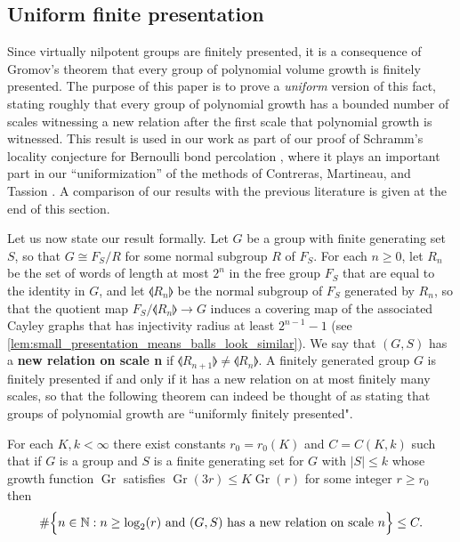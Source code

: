 \subsection{Uniform finite presentation}

Since virtually nilpotent groups are finitely presented, it is a consequence of Gromov's theorem that every group of polynomial volume growth is finitely presented. The purpose of this paper is to prove a \emph{uniform} version of this fact, stating roughly that every group of polynomial growth has a bounded number of scales witnessing a new relation after the first scale that polynomial growth is witnessed. This result is used in our work \cite{Locality} as part of our proof  of Schramm's locality conjecture for Bernoulli bond percolation \cite{MR2773031}, where it plays an important part in our ``uniformization'' of the methods of Contreras, Martineau, and Tassion \cite{contreras2021supercritical}.  A comparison of our results with  the previous literature is given at the end of this section. 

\medskip

Let us now state our result formally.
Let $G$ be a group with finite generating set $S$, so that $G\cong F_S / R$ for some normal subgroup $R$ of $F_S$. For each $n \geq 0$, let $R_n$ be the set of words of length at most $2^n$ in the free group $F_S$ that are equal to the identity in $G$, and let $\llangle R_n \rrangle$ be the normal subgroup of $F_S$ generated by $R_n$, so that the quotient map $F_S/\llangle R_n\rrangle \to G$ induces a covering map of the associated Cayley graphs that has injectivity radius at least $2^{n-1}-1$ (see \cref{lem:small_presentation_means_balls_look_similar}). We say that $(G,S)$ has a \textbf{new relation on scale n} if $\llangle R_{n+1} \rrangle \neq \llangle R_{n} \rrangle$. A finitely generated group $G$ is finitely presented if and only if it has a new relation on at most finitely many scales, so that the following theorem can indeed be thought of as stating that groups of polynomial growth are ``uniformly finitely presented".

\begin{thm}
\label{thm:main}
For each $K,k<\infty$ there exist constants $r_0=r_0(K)$ and $C=C(K,k)$ such that if $G$ is a group and $S$ is a finite generating set for $G$ with $|S|\leq k$ whose growth function $\operatorname{Gr}$ satisfies $\operatorname{Gr}(3r)\leq K \operatorname{Gr}(r)$ for some integer $r\geq r_0$ then
\[
\#\Bigl\{n\in \mathbb{N} : n\geq \log_2(r) \text{ and $(G,S)$ has a new relation on scale $n$} \Bigr\}\leq C.
\]
\end{thm}

